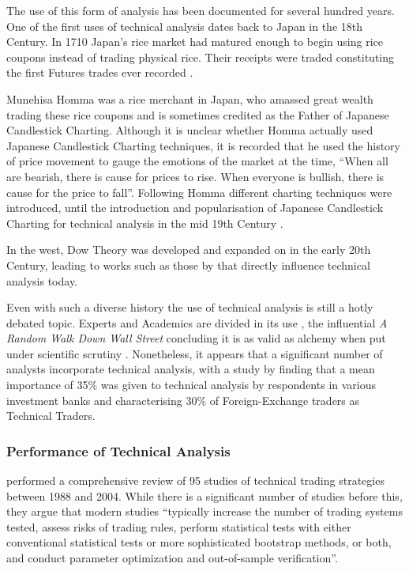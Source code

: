 \documentclass[12pt, oneside, a4paper]{article}
\theoremstyle{definition}
\begin{document}
The use of this form of analysis has been documented for several hundred years. One of the first uses of technical analysis dates back to Japan in the 18th Century. In 1710 Japan's rice market had matured enough to begin using rice coupons instead of trading physical rice. Their receipts were traded constituting the first Futures trades ever recorded \citep[p.~15]{jcct1991}. 

Munehisa Homma was a rice merchant in Japan, who amassed great wealth trading these rice coupons and is sometimes credited as the Father of Japanese Candlestick Charting. Although it is unclear whether Homma actually used Japanese Candlestick Charting techniques, it is recorded that he used the history of price movement to gauge the emotions of the market at the time, ``When all are bearish, there is cause for prices to rise. When everyone is bullish, there is cause for the price to fall''. Following Homma different charting techniques were introduced, until the introduction and popularisation of Japanese Candlestick Charting for technical analysis in the mid 19th Century \citep[p.~18]{jcct1994}.

In the west, Dow Theory was developed and expanded on in the early 20th Century, leading to works such as those by \cite{edwards1948technical} that directly influence technical analysis today.

Even with such a diverse history the use of technical analysis is still a hotly debated topic. Experts and Academics are divided in its use \citep{foundations}, the influential \textit{A Random Walk Down Wall Street} concluding it is as valid as alchemy when put under scientific scrutiny \cite[p.~159]{randomwalk2012}. Nonetheless, it appears that a significant number of analysts incorporate technical analysis, with a study by \cite{examininguse1997} finding that a mean importance of 35\% was given to technical analysis by respondents in various investment banks and \cite{cheung2000currency} characterising 30\% of Foreign-Exchange traders as Technical Traders. 

\subsubsection{Performance of Technical Analysis}
\label{taperformance}
\cite{taprofitability} performed a comprehensive review of 95 studies of technical trading strategies between 1988 and 2004. While there is a significant number of studies before this, they argue that modern studies ``typically increase the number of trading systems tested, assess risks of trading rules,
perform statistical tests with either conventional statistical tests or more sophisticated bootstrap methods, or both, and conduct parameter optimization and out-of-sample verification''.
\end{document}
